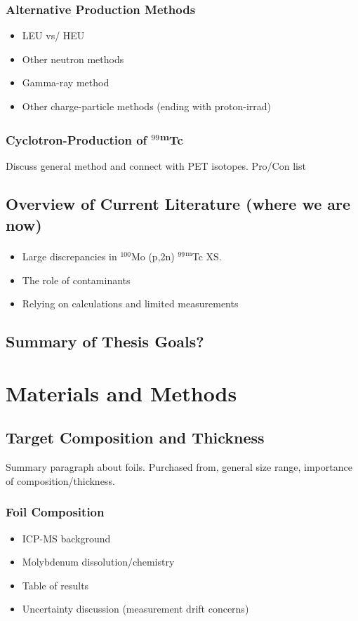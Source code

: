 \documentclass[final,3p,times,twocolumn,authoryear]{elsarticle_modified}
\newcommand{\tc}{ {\normalfont $^{99}$\textsuperscript{m}Tc} }
\newcommand{\nuc}[2]{{\normalfont $^{#1}$#2} }
\begin{document}
		\subsubsection{Alternative Production Methods}
		\begin{itemize}
			\itemsep-0.2em 
			\item LEU vs/ HEU
			\item Other neutron methods
			\item Gamma-ray method
			\item Other charge-particle methods (ending with proton-irrad)
		\end{itemize}
		\subsubsection{Cyclotron-Production of \tc}
		Discuss general method and connect with PET isotopes. Pro/Con list
	\subsection{Overview of Current Literature (where we are now)}
	\begin{itemize}
		\itemsep-0.2em 
		\item Large discrepancies in \nuc{100}{Mo}(p,2n)\tc XS.
		\item The role of contaminants
		\item Relying on calculations and limited measurements
	\end{itemize}		
	\subsection{Summary of Thesis Goals?}

\section{Materials and Methods}
\label{Methods}
\subsection{Target Composition and Thickness}
\label{ICP-MS}
Summary paragraph about foils. Purchased from, general size range, importance of composition/thickness.
	\subsubsection{Foil Composition}
	\begin{itemize}
	\itemsep-0.2em 
	  \item ICP-MS background
	  \item Molybdenum dissolution/chemistry
	  \item Table of results
	  \item Uncertainty discussion (measurement drift concerns)
	\end{itemize}
\end{document}
